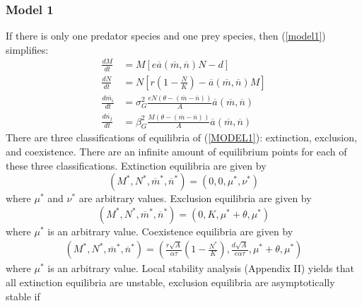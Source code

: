 \documentclass{amsart}
\theoremstyle{definition}
\theoremstyle{remark}
\numberwithin{equation}{section}
\begin{document}
\subsubsection{Model 1}
If there is only one predator species and one prey species, then (\ref{model1}) simplifies:
\begin{subequations}
	\label{MODEL1}
	\begin{align}
		\label{eq:MODEL1_A}
		\frac{dM}{dt} &= M\left[e\overline{a}(\overline{m}, \overline{n})N - d\right] \\[5px]
		\label{eq:MODEL1_B}
		\frac{dN}{dt} &= N\left[r\left(1 - \frac{N}{K}\right) - \overline{a}(\overline{m}, \overline{n})M\right] \\[5px]
		\label{eq:MODEL1_C}
		\frac{d\overline{m_i}}{dt} &= \sigma_{G}^2\frac{eN(\theta - (\overline{m} - \overline{n}))}{A}\overline{a}(\overline{m}, \overline{n}) \\[5px]
		\label{eq:MODEL1_D}
		\frac{d\overline{n_j}}{dt} &= \beta_{G}^2\frac{M(\theta - (\overline{m} - \overline{n}))}{A}\overline{a}(\overline{m}, \overline{n})
	\end{align}
\end{subequations}
There are three classifications of equilibria of (\ref{MODEL1}): extinction, exclusion, and coexistence.  There are an infinite amount of equilibrium points for each of these three classifications.  Extinction equilibria are given by
\begin{equation}
	\label{extinction_MODEL1}
	(M^*, N^*, \overline{m}^*, \overline{n}^*) = (0, 0, \mu^*, \nu^*)
\end{equation}
where $\mu^*$ and $\nu^*$ are arbitrary values.  Exclusion equilibria are given by
\begin{equation}
	\label{exclusion_MODEL1}
	(M^*, N^*, \overline{m}^*, \overline{n}^*) = (0, K, \mu^* + \theta, \mu^*)
\end{equation}
where $\mu^*$ is an arbitrary value.  Coexistence equilibria are given by
\begin{equation}
	\label{coexistence_MODEL1}
	\begin{aligned}
		(M^*, N^*, \overline{m}^*, \overline{n}^*) = \left(\frac{r\sqrt{A}}{\alpha\tau}\left(1 - \frac{N^*}{K}\right), \frac{d\sqrt{A}}{e\alpha\tau}, \mu^* + \theta, \mu^*\right)
	\end{aligned}
\end{equation}
where $\mu^*$ is an arbitrary value.  Local stability analysis (Appendix II) yields that all extinction equilibria are unstable, exclusion equilibria are asymptotically stable if
\end{document}
